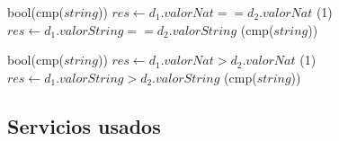 
        {bool}{\bigo(cmp($string$))}{
        \State $res \gets d_1.valorNat == d_2.valorNat$             \comment \bigo(1)
    \Else
        \State $res \gets d_1.valorString == d_2.valorString$       \comment \bigo(cmp($string$))
    \EndIf
}

        {bool}{\bigo(cmp($string$))}{
        \State $res \gets d_1.valorNat > d_2.valorNat$              \comment \bigo(1)
    \Else
        \State $res \gets d_1.valorString > d_2.valorString$        \comment \bigo(cmp($string$))
    \EndIf
}

\subsection{Servicios usados}

